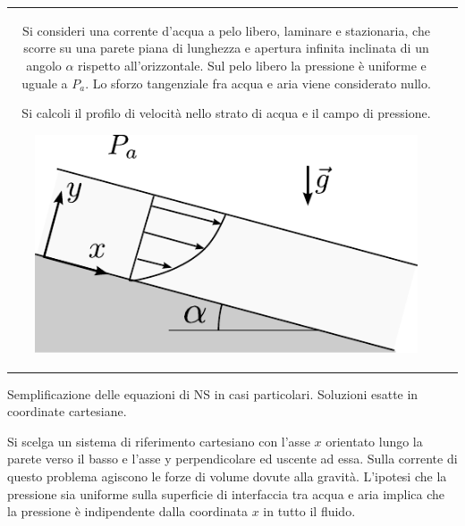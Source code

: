 \noindent
\begin{tabular}{cc}
\begin{minipage}[c]{0.60\textwidth}
\begin{exerciseS}
Si consideri una corrente d'acqua a pelo libero, laminare e stazionaria, che
scorre su una parete piana di lunghezza e apertura infinita  inclinata di un angolo $\alpha$ rispetto all'orizzontale.
Sul pelo libero la pressione è uniforme e uguale a $P_a$. Lo sforzo tangenziale fra acqua e aria viene considerato nullo.

Si calcoli il profilo di velocità nello strato di acqua e il campo di pressione.
\end{exerciseS}
\end{minipage}
\begin{minipage}[c]{0.35\textwidth}
   \begin{center}
   \includegraphics[width=0.90\textwidth]{./fig/slnEsatte-scivolo}
   \end{center}
\end{minipage}
\end{tabular}

\sol

\partone
 Semplificazione delle equazioni di NS in casi particolari. 
Soluzioni esatte in coordinate cartesiane.

\parttwo
Si scelga un sistema di riferimento cartesiano con l'asse $x$ orientato lungo la parete verso il basso e l'asse y perpendicolare ed uscente ad essa.
Sulla corrente di questo problema agiscono le forze di volume dovute alla gravità.
L'ipotesi che la pressione sia uniforme sulla superficie di interfaccia
 tra acqua e aria implica che la pressione è indipendente dalla coordinata $x$ in tutto il fluido.

